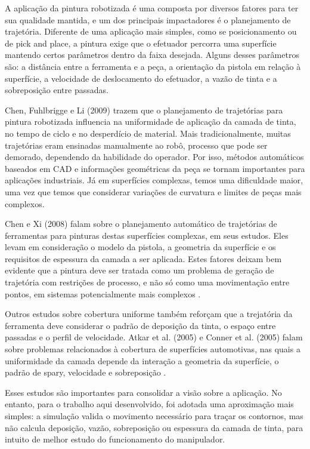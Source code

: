 A aplicação da pintura robotizada é uma composta por diversos fatores para ter sua qualidade mantida, e um dos principais impactadores é o planejamento de trajetória. Diferente de uma aplicação mais simples, como se posicionamento ou de pick and place, a pintura exige que o efetuador percorra uma superfície mantendo certos parâmetros dentro da faixa desejada. Alguns desses parâmetros são: a distância entre a ferramenta e a peça, a orientação da pistola em relação à superfície, a velocidade de deslocamento do efetuador, a vazão de tinta e a sobreposição entre passadas.

Chen, Fuhlbrigge e Li (2009) trazem que o planejamento de trajetórias para pintura robotizada influencia na uniformidade de aplicação da camada de tinta, no tempo de ciclo e no desperdício de material. Mais tradicionalmente, muitas trajetórias eram ensinadas manualmente ao robô, processo que pode ser demorado, dependendo da habilidade do operador. Por isso, métodos automáticos baseados em CAD e informações geométricas da peça se tornam importantes para aplicações industriais. Já em superfícies complexas, temos uma dificuldade maior, uma vez que temos que considerar variações de curvatura e limites de peças mais complexos\cite{chen2009}.

Chen e Xi (2008) falam sobre o planejamento automático de trajetórias de ferramentas para pinturas destas superfícies complexas, em seus estudos. Eles levam em consideração o modelo da pistola, a geometria da superfície e os requisitos de espessura da camada a ser aplicada. Estes fatores deixam bem evidente que a pintura deve ser tratada como um problema de geração de trajetória com restrições de processo, e não só como uma movimentação entre pontos, em sistemas potencialmente mais complexos \cite{chenxi2008}.

Outros estudos sobre cobertura uniforme também reforçam que a trejatória da ferramenta deve considerar o padrão de deposição da tinta, o espaço entre passadas e o perfil de velocidade. Atkar et al. (2005) e Conner et al. (2005) falam sobre problemas relacionados à cobertura de superfícies automotivas, nas quais a uniformidade da camada depende da interação a geometria da superfície, o padrão de spary, velocidade e sobreposição \cite{atkar2005,conner2005}.

Esses estudos são importantes para consolidar a visão sobre a aplicação. No entanto, para o trabalho aqui desenvolvido, foi adotada uma aproximação mais simples: a simulação valida o movimento necessário para traçar os contornos, mas não calcula deposição, vazão, sobreposição ou espessura da camada de tinta, para intuito de melhor estudo do funcionamento do manipulador.

